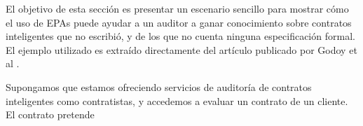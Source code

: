 El objetivo de esta sección es presentar un escenario sencillo para mostrar cómo el uso de EPAs puede ayudar a un auditor a ganar conocimiento sobre contratos inteligentes que no escribió, y de los que no cuenta ninguna especificación formal.
El ejemplo utilizado es extraído directamente del artículo publicado por Godoy et al \cite{predicate-abstraction-for-smart-contract-validation}.

Supongamos que estamos ofreciendo servicios de auditoría de contratos inteligentes como contratistas, y accedemos a evaluar un contrato de un cliente.
El contrato pretende